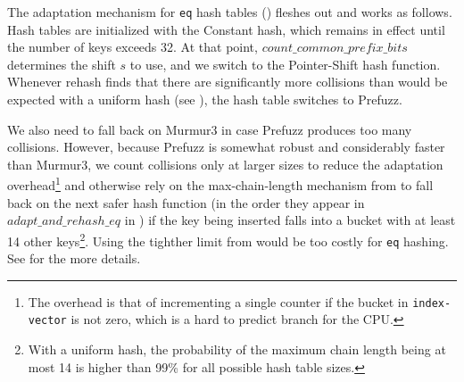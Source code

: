 \documentclass[sigconf]{acmart}
\newcommand*\lisp[1]{\texttt{#1}}
\begin{document}
The adaptation mechanism for \lisp{eq} hash tables () fleshes out  and works as follows.
Hash tables are initialized with the Constant hash, which remains in effect until the number of keys exceeds 32.
At that point, $\mathit{count\_common\_prefix\_bits}$ determines the shift $s$ to use, and we switch to the Pointer-Shift hash function.
Whenever rehash finds that there are significantly more collisions than would be expected with a uniform hash (see ), the hash table switches to Prefuzz.

We also need to fall back on Murmur3 in case Prefuzz produces too many collisions.
However, because Prefuzz is somewhat robust and considerably faster than Murmur3, we count collisions only at larger sizes to reduce the adaptation overhead\footnote{The overhead is that of incrementing a single counter if the bucket in \lisp{index-vector} is not zero, which is a hard to predict branch for the CPU.} and otherwise rely on the max-chain-length mechanism from  to fall back on the next safer hash function (in the order they appear in $adapt\_and\_rehash\_eq$ in ) if the key being inserted falls into a bucket with at least 14 other keys\footnote{With a uniform hash, the probability of the maximum chain length being at most 14 is higher than 99\% for all possible hash table sizes.}.
Using the tighther limit from  would be too costly for \lisp{eq} hashing.
See  for the more details.
\end{document}
